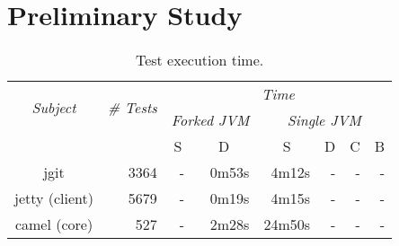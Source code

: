 \section{Preliminary Study}

\newcommand{\forkSeq}{F-S}
\newcommand{\forkDia}{F-D}
\newcommand{\singleJVMSeq}{S-S}
\newcommand{\singleJVMDia}{S-D}
\newcommand{\singleJVMClass}{S-C}
\newcommand{\singleJVMMethod}{S-B}

\begin{table*}[t]
  \centering
  \begin{tabular}{|c|r|r|r|r|r|r|r|}
    \hline
    \multirow{2}{*}{\emph{Subject}} & \multirow{2}{*}{\emph{\# Tests}} &  \multicolumn{6}{c|}{\emph{Time}}\\
    \cline{3-8}
    & & \multicolumn{2}{c|}{\emph{Forked JVM}} & \multicolumn{4}{c|}{\emph{Single JVM}}   \\
    \cline{3-8}
    & & \multicolumn{1}{c|}{S} & \multicolumn{1}{c|}{D} & \multicolumn{1}{c|}{S} & \multicolumn{1}{c|}{D} & \multicolumn{1}{c|}{C} & \multicolumn{1}{c|}{B}\\     \hline
    jgit & 3364 & - & 0m53s & 4m12s  & - & -  & - \\
    \hline
    jetty (client) & 5679 & - & 0m19s  & 4m15s  & - & - & - \\
    \hline
    camel (core) & 527 & - & 2m28s & 24m50s & - & - & -\\
    \hline
  \end{tabular}
  \caption{\label{table:cost}Test execution time.}
\end{table*}

